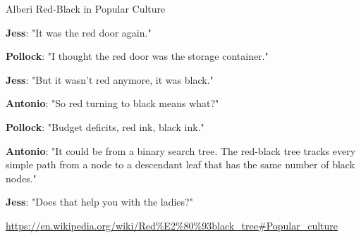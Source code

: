 \begin{OnlySlides}{Alberi Red-Black in Popular Culture}

\vspace{-9pt}

\bigskip
\textbf{Jess}: "It was the red door again."

\textbf{Pollock}: "I thought the red door was the storage container."

\textbf{Jess}: "But it wasn't red anymore, it was black."

\textbf{Antonio}: "So red turning to black means what?"

\textbf{Pollock}: "Budget deficits, red ink, black ink."

\textbf{Antonio}: "It could be from a binary search tree. \alert{The red-black tree tracks every simple path from a node to a descendant leaf that has the same number of black nodes}."

\textbf{Jess}: "\alert{Does that help you with the ladies?}"


\bigskip
\scriptsize
\url{https://en.wikipedia.org/wiki/Red\%E2\%80\%93black_tree\#Popular_culture}

\end{OnlySlides}







